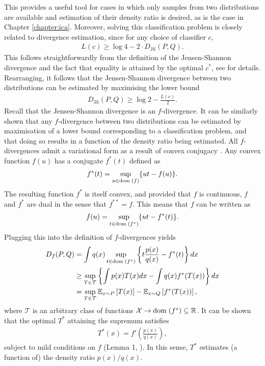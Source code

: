 This provides a useful tool for cases in which only samples from two distributions are available and estimation of their density ratio is desired, as is the case in Chapter \ref{chapter:ica}.
Moreover, solving this classification problem is closely related to divergence estimation, since for any choice of classifier $c$,
%
\begin{align*}
L(c) \geq \log 4 - 2 \cdot D_{\text{JS}}(P, Q).
\end{align*}
%
This follows straightforwardly from the definition of the Jensen-Shannon divergence and the fact that equality is attained by the optimal $c^*$, see \cite{goodfellow2014generative} for details.
Rearranging, it follows that the Jensen-Shannon divergence between two distributions can be estimated by maximising the lower bound
%
\begin{align*}
D_{\text{JS}}(P, Q) \geq \log 2 - \frac{L(c)}{2}.
\end{align*}
%
Recall that the Jensen-Shannon divergence is an $f$-divergence. 
It can be similarly shown that any $f$-divergence between two distributions can be estimated by maximisation of a lower bound corresponding to a classification problem, and that doing so results in a function of the density ratio being estimated.
All $f$-divergences admit a variational form as a result of convex conjugacy \citep{nguyen10ratio}.
Any convex function $f(u)$ has a conjugate $f^*(t)$ defined as
%
\begin{align*}
f^*(t) = \sup_{u \in {\bf{\rm dom}}\;(f)} \{ut - f(u)\}.
\end{align*}
%
The resulting function $f^*$ is itself convex, and
provided that $f$ is continuous, $f$ and $f^*$ are dual in the sense that $f^{**} = f$.
This means that $f$ can be written as
%
\begin{align*}
f(u) = \sup_{t \in {\bf{\rm dom}}\;(f^*)} \{ut - f^*(t)\}.
\end{align*}
%
Plugging this into the definition of $f$-divergences yields
%
\begin{align*}
D_f(P, Q) &= \int q(x) \sup_{t \in {\bf{\rm dom}}\;(f^*)} \left\{t \frac{p(x)}{q(x)} - f^*(t) \right\} dx \\
& \geq \sup_{T \in \mathcal{T}} \left\{ \int p(x) T(x) dx - \int q(x) f^*(T(x)) \right\} dx \\
&= \sup_{T \in \mathcal{T}} \mathbb{E}_{x \sim P} \left[ T(x) \right] - \mathbb{E}_{x \sim Q} \left[ f^*(T(x)) \right],
\end{align*}
where $\mathcal{T}$ is an arbitrary class of functions $\mathcal{X} \to {\bf{\rm dom}}\;(f^*) \subseteq \mathbb{R}$.
It can be shown that the optimal $T^*$ attaining the supremum satisfies 
\begin{align*}
T^*(x) = f'\left( \frac{p(x)}{q(x)}\right),
\end{align*}
subject to mild conditions on $f$ (Lemma 1, \cite{nguyen10ratio}). 
In this sense, $T^*$ estimates (a function of) the density ratio $p(x)/q(x)$.

